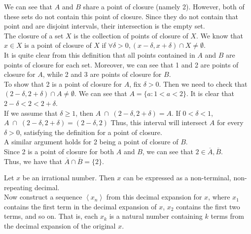 \documentclass[12pt]{article}
\newenvironment{problem}[2][Problem]{\begin{trivlist}
\item[\hskip \labelsep {\bfseries #1}\hskip \labelsep {\bfseries #2.}]}{\end{trivlist}}
\begin{document}
We can see that $A$ and $B$ share a point of closure (namely 2). However, both of these sets do not contain this point of closure. Since they do not contain that point and are disjoint intervals, their intersection is the empty set.\\

The closure of a set $X$ is the collection of points of closure of $X$. We know that $x \in X$ is a point of closure of $X$ if $\forall \delta > 0, (x - \delta, x + \delta) \cap X \neq \emptyset$.\\

It is quite clear from this definition that all points contained in $A$ and $B$ are points of closure for each set. Moreover, we can see that 1 and 2 are points of closure for $A$, while 2 and 3 are points of closure for $B$.\\

To show that 2 is a point of closure for $A$, fix $\delta > 0$. Then we need to check that $(2 - \delta, 2 + \delta) \cap A \neq \emptyset$. We can see that $A = \{a: 1 < a < 2\}$. It is clear that $2 - \delta < 2 < 2 + \delta$.\\

If we assume that $\delta \geq 1$, then $A \; \cap \; (2 - \delta, 2 + \delta) = A$. If $0 < \delta < 1$, $A \; \cap \; (2 - \delta, 2 + \delta) = (2 - \delta, 2)$ Thus, this interval will intersect $A$ for every $\delta > 0$, satisfying the definition for a point of closure.\\

A similar argument holds for 2 being a point of closure of $B$.\\

Since 2 is a point of closure for both $A$ and $B$, we can see that $2 \in \overline{A}, \overline{B}$.\\

Thus, we have that $\overline{A} \cap \overline{B} = \{2\}$.\\

\begin{problem}{5}
\end{problem}

Let $x$ be an irrational number. Then $x$ can be expressed as a non-terminal, non-repeating decimal.\\

Now construct a sequence $\left<x_n\right>$ from this decimal expansion for $x$, where $x_1$ contains the first term in the decimal expansion of $x$, $x_2$ contains the first two terms, and so on. That is, each $x_k$ is a natural number containing $k$ terms from the decimal expansion of the original $x$.\\
\end{document}
